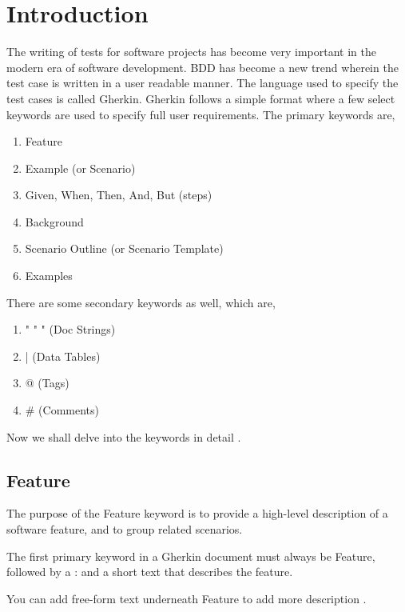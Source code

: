 \documentclass[conference, onecolumn, a4, 12pt]{IEEEtran}
\begin{document}
\section{Introduction}
The writing of tests for software projects has become very important in the modern era of software development. BDD has become a new trend wherein the test case is written in a user readable manner. The language used to specify the test cases is called Gherkin. Gherkin follows a simple format where a few select keywords are used to specify full user requirements.\cite{a1} The primary keywords are,
\begin{enumerate}
	\item Feature
	\item Example (or Scenario)
	\item Given, When, Then, And, But (steps)
	\item Background
	\item Scenario Outline (or Scenario Template)
	\item Examples
\end{enumerate}

There are some secondary keywords as well, which are,

\begin{enumerate}
	\item " " " (Doc Strings)
	\item | (Data Tables)
	\item @ (Tags)
	\item \# (Comments)
\end{enumerate}

Now we shall delve into the keywords in detail \cite{a1}.
\subsection{Feature}
The purpose of the Feature keyword is to provide a high-level description of a software feature, and to group related scenarios.

The first primary keyword in a Gherkin document must always be Feature, followed by a : and a short text that describes the feature.

You can add free-form text underneath Feature to add more description \cite{a1}.
\end{document}
